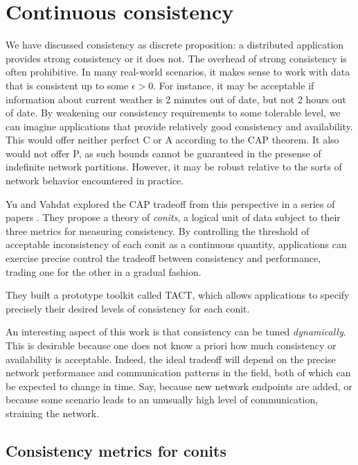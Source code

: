 \section{Continuous consistency}
\label{sec:contcons}

We have discussed consistency as discrete proposition: a distributed
application provides strong consistency or it does not. The overhead
of strong consistency is often prohibitive. In many real-world
scenarios, it makes sense to work with data that is consistent up to
some $\epsilon > 0$. For instance, it may be acceptable if information
about current weather is 2 minutes out of date, but not 2 hours out of
date. By weakening our consistency requirements to some tolerable
level, we can imagine applications that provide relatively good
consistency and availability. This would offer neither perfect C or A
according to the CAP theorem. It also would not offer P, as such
bounds cannot be guaranteed in the presense of indefinite network
partitions. However, it may be robust relative to the sorts of network
behavior encountered in practice.

Yu and Vahdat explored the CAP tradeoff from this perspective in a
series of papers \cite{2000tact} \cite{2000tactalgorithms}
\cite{10.5555/1251229.1251250} \cite{DBLP:conf/icdcs/YuV01}
\cite{2002tact}. They propose a theory of \emph{conits}, a logical
unit of data subject to their three metrics for measuring
consistency. By controlling the threshold of acceptable inconsistency
of each conit as a continuous quantity, applications can exercise
precise control the tradeoff between consistency and performance,
trading one for the other in a gradual fashion.

They built a prototype toolkit called TACT, which allows applications
to specify precisely their desired levels of consistency for each
conit.

An interesting aspect of this work is that consistency can be tuned
\emph{dynamically}. This is desirable because one does not know a
priori how much consistency or availability is acceptable. Indeed, the
ideal tradeoff will depend on the precise network performance and
communication patterns in the field, both of which can be expected to
change in time. Say, because new network endpoints are added, or
because some scenario leads to an unusually high level of
communication, straining the network.


\subsection{Consistency metrics for conits}

